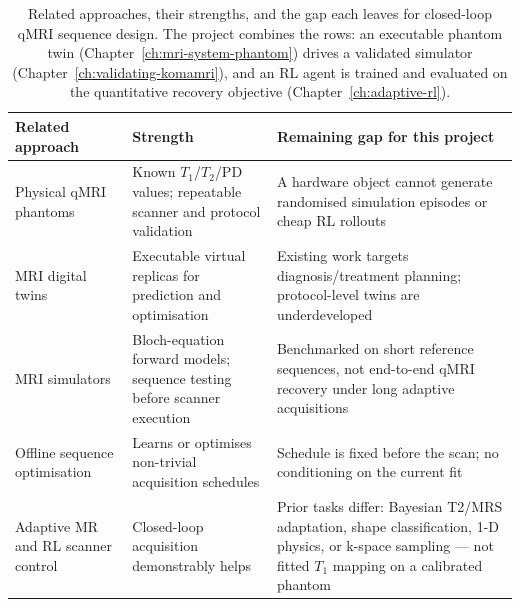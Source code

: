 \begin{table}[!htbp]
\centering
\small
\setlength{\tabcolsep}{4pt}
\renewcommand{\arraystretch}{0.96}
\begin{tabularx}{\linewidth}{>{\raggedright\arraybackslash}p{3.4cm}
>{\raggedright\arraybackslash}X
>{\raggedright\arraybackslash}X}
\toprule
Related approach & Strength & Remaining gap for this project \\
\midrule
Physical qMRI phantoms~\cite{keenan_phantoms_2024,russek_system_phantom_characterization_2020} &
Known $T_1$/$T_2$/PD values; repeatable scanner and protocol validation &
A hardware object cannot generate randomised simulation episodes or cheap RL rollouts \\
\addlinespace
MRI digital twins~\cite{greggio_digital_twinning_mri_2026} &
Executable virtual replicas for prediction and optimisation &
Existing work targets diagnosis/treatment planning; protocol-level twins are underdeveloped \\
\addlinespace
MRI simulators~\cite{komaMRI:23,stoecker_jemris_2010,liu_mrilab_2017} &
Bloch-equation forward models; sequence testing before scanner execution &
Benchmarked on short reference sequences, not end-to-end qMRI recovery under long adaptive acquisitions \\
\addlinespace
Offline sequence optimisation~\cite{MRISeqSupLearning:21,Jordan_MRF_AUTO:21} &
Learns or optimises non-trivial acquisition schedules &
Schedule is fixed before the scan; no conditioning on the current fit \\
\addlinespace
Adaptive MR and RL scanner control~\cite{adaptive_mri:23,Walk_RL_CONTROL_MRI:19,zhu2018autoseq,pineda_active_mri_rl_2020} &
Closed-loop acquisition demonstrably helps &
Prior tasks differ: Bayesian T2/MRS adaptation, shape classification, 1-D physics, or k-space sampling --- not fitted $T_1$ mapping on a calibrated phantom \\
\bottomrule
\end{tabularx}
\caption{Related approaches, their strengths, and the gap each leaves for
closed-loop qMRI sequence design. The project combines the rows: an
executable phantom twin (Chapter~\ref{ch:mri-system-phantom}) drives a
validated simulator (Chapter~\ref{ch:validating-komamri}), and an RL agent is
trained and evaluated on the quantitative recovery objective
(Chapter~\ref{ch:adaptive-rl}).}
\label{tab:bg-related-gaps}
\end{table}


